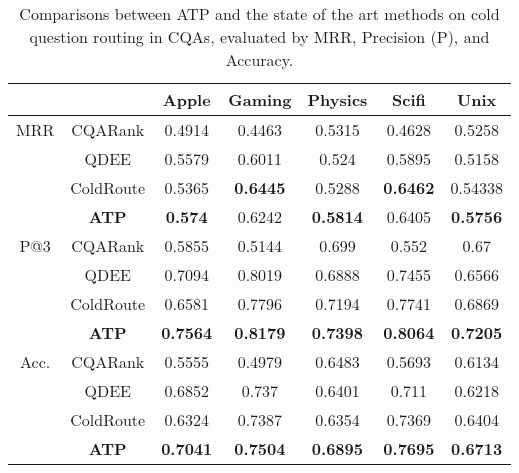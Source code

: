\documentclass[letterpaper]{article} \usepackage{aaai19}  \usepackage{times}  \usepackage{helvet}  \usepackage{courier}  \usepackage{url}  \usepackage{graphicx}  \usepackage{booktabs} \usepackage{xcolor}
\begin{document}
\begin{table}[t!]
\small
\centering
\setlength\tabcolsep{4pt} \caption{Comparisons between ATP and the state of the art methods on cold question routing in CQAs, evaluated by MRR, Precision (P), and Accuracy.}
\begin{tabular}{@{}c|c|ccccc@{}}
 &  & Apple & Gaming & Physics & Scifi & Unix\\ \midrule
MRR & CQARank & 0.4914 & 0.4463 & 0.5315 & 0.4628 & 0.5258\\
 & QDEE & 0.5579 & 	0.6011 & 	0.524 & 	0.5895	 & 0.5158 \\
 & ColdRoute & 0.5365 &	\boldmath\textbf{0.6445} & 0.5288 & \boldmath\textbf{0.6462} &	0.54338 \\
 & \boldmath\textbf{ATP} & \boldmath\textbf{0.574} & 0.6242 & \boldmath\textbf{0.5814} & 0.6405 & \boldmath\textbf{0.5756}\\ \midrule


P@3 & CQARank & 0.5855 & 0.5144 & 0.699 & 0.552 & 0.67\\
 & QDEE &	0.7094 &	0.8019 &	0.6888 &	0.7455 &	0.6566 \\
 & ColdRoute & 	0.6581 & 	0.7796 & 	0.7194 & 	0.7741 & 	0.6869 \\
 & \boldmath\textbf{ATP} & \boldmath\textbf{0.7564} & \boldmath\textbf{0.8179} & \boldmath\textbf{0.7398} & \boldmath\textbf{0.8064} & \boldmath\textbf{0.7205} \\ \midrule 

Acc. & CQARank & 	0.5555 & 	0.4979 & 	0.6483 & 	0.5693 & 	0.6134\\
 & QDEE  & 	0.6852 & 	0.737 & 	0.6401	 & 0.711 & 	0.6218 \\
 & ColdRoute & 	0.6324 & 	0.7387 & 	0.6354	 & 0.7369 & 	0.6404\\
 & \boldmath\textbf{ATP} & 	\boldmath\textbf{0.7041} & 	\boldmath\textbf{0.7504} & 	\boldmath\textbf{0.6895} & 	\boldmath\textbf{0.7695}	 & \boldmath\textbf{0.6713}\\
  \bottomrule
 \end{tabular}
\label{tab:ATP_ColdQuestion_Routing_Table}
\end{table}
\end{document}
